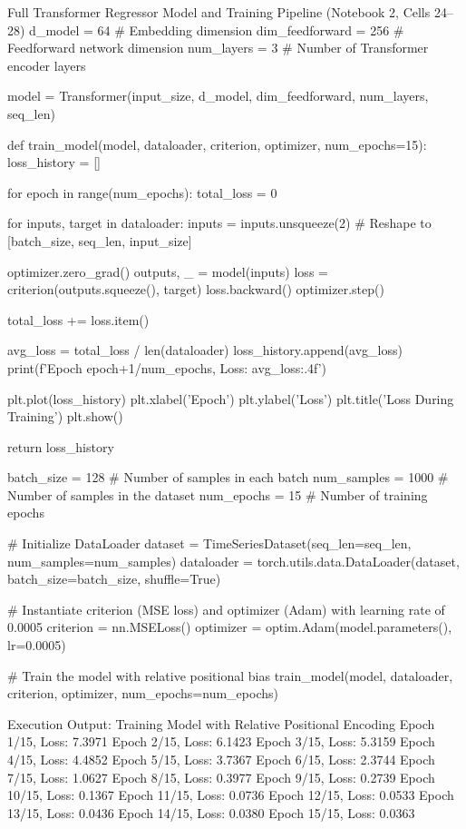 \documentclass[11pt,a4paper]{article}
\begin{document}
\begin{solutioncode}[label=lst:transformer_regressor]{Full Transformer Regressor Model and Training Pipeline (Notebook 2, Cells 24--28)}
d_model = 64          # Embedding dimension
dim_feedforward = 256 # Feedforward network dimension
num_layers = 3        # Number of Transformer encoder layers

model = Transformer(input_size, d_model, dim_feedforward, num_layers, seq_len)

def train_model(model, dataloader, criterion, optimizer, num_epochs=15):
    loss_history = []
    
    for epoch in range(num_epochs):
        total_loss = 0
        
        for inputs, target in dataloader:
            inputs = inputs.unsqueeze(2)  # Reshape to [batch_size, seq_len, input_size]
            
            optimizer.zero_grad()
            outputs, _ = model(inputs)
            loss = criterion(outputs.squeeze(), target)
            loss.backward()
            optimizer.step()
            
            total_loss += loss.item()
        
        avg_loss = total_loss / len(dataloader)
        loss_history.append(avg_loss)
        print(f'Epoch {epoch+1}/{num_epochs}, Loss: {avg_loss:.4f}')
    
    plt.plot(loss_history)
    plt.xlabel('Epoch')
    plt.ylabel('Loss')
    plt.title('Loss During Training')
    plt.show()
    
    return loss_history

batch_size = 128   # Number of samples in each batch
num_samples = 1000 # Number of samples in the dataset
num_epochs = 15    # Number of training epochs

# Initialize DataLoader
dataset = TimeSeriesDataset(seq_len=seq_len, num_samples=num_samples)
dataloader = torch.utils.data.DataLoader(dataset, batch_size=batch_size, shuffle=True)

# Instantiate criterion (MSE loss) and optimizer (Adam) with learning rate of 0.0005
criterion = nn.MSELoss()
optimizer = optim.Adam(model.parameters(), lr=0.0005)

# Train the model with relative positional bias
train_model(model, dataloader, criterion, optimizer, num_epochs=num_epochs)
\end{solutioncode}

\begin{macterminal}{Execution Output: Training Model with Relative Positional Encoding}
Epoch 1/15, Loss: 7.3971
Epoch 2/15, Loss: 6.1423
Epoch 3/15, Loss: 5.3159
Epoch 4/15, Loss: 4.4852
Epoch 5/15, Loss: 3.7367
Epoch 6/15, Loss: 2.3744
Epoch 7/15, Loss: 1.0627
Epoch 8/15, Loss: 0.3977
Epoch 9/15, Loss: 0.2739
Epoch 10/15, Loss: 0.1367
Epoch 11/15, Loss: 0.0736
Epoch 12/15, Loss: 0.0533
Epoch 13/15, Loss: 0.0436
Epoch 14/15, Loss: 0.0380
Epoch 15/15, Loss: 0.0363
\end{macterminal}
\end{document}
